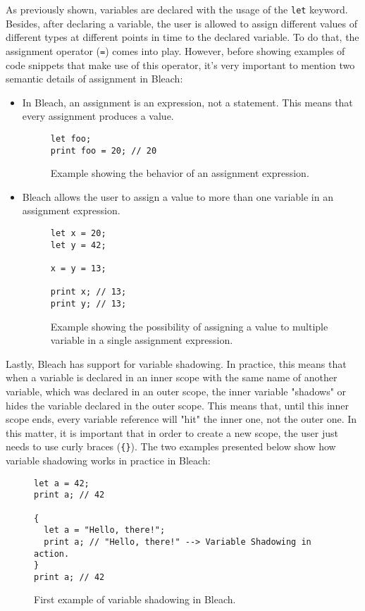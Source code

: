 As previously shown, variables are declared with the usage of the \texttt{let} keyword. Besides, after declaring a variable, the user is allowed to assign different values of different types at different points in time to the declared variable. To do that, the assignment operator (\texttt{=}) comes into play. However, before showing examples of code snippets that make use of this operator, it's very important to mention two semantic details of assignment in Bleach:
\begin{itemize}
    \item In Bleach, an assignment is an expression, not a statement. This means that every assignment produces a value.
    \begin{figure}[H]
        \centering
        \begin{lstlisting}
let foo;
print foo = 20; // 20
        \end{lstlisting}
        \caption{Example showing the behavior of an assignment expression.}
    \end{figure}
    
    \item Bleach allows the user to assign a value to more than one variable in an assignment expression.
    \begin{figure}[H]
        \centering
        \begin{lstlisting}
let x = 20;
let y = 42;

x = y = 13;

print x; // 13;
print y; // 13;
        \end{lstlisting}
        \caption{Example showing the possibility of assigning a value to multiple variable in a single assignment expression.}
    \end{figure}
\end{itemize}

Lastly, Bleach has support for variable shadowing. In practice, this means that when a variable is declared in an inner scope with the same name of another variable, which was declared in an outer scope, the inner variable "shadows" or hides the variable declared in the outer scope. This means that, until this inner scope ends, every variable reference will "hit" the inner one, not the outer one. In this matter, it is important that in order to create a new scope, the user just needs to use curly braces (\texttt{\{\}}). The two examples presented below show how variable shadowing works in practice in Bleach:
\begin{figure}[H]
    \centering
    \begin{lstlisting}
let a = 42;
print a; // 42

{
  let a = "Hello, there!";
  print a; // "Hello, there!" --> Variable Shadowing in action.
}
print a; // 42
    \end{lstlisting}
    \caption{First example of variable shadowing in Bleach.}
\end{figure}

